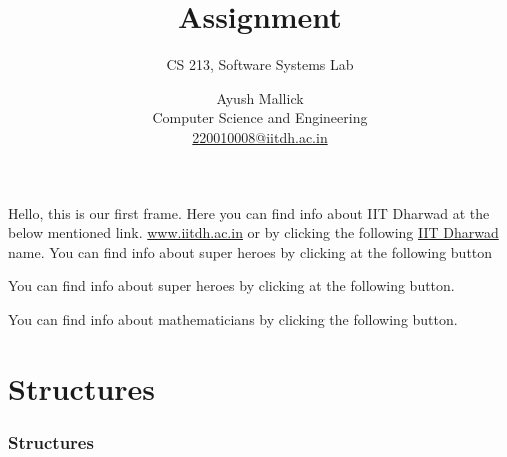 \documentclass{beamer}
\title{Assignment}
\subtitle{CS 213, Software Systems Lab}
\author[]{Ayush Mallick\\Computer Science and Engineering\\\href{mailto:220010008@iitdh.ac.in}{220010008@iitdh.ac.in}}
\institute[CSE, IIT Dharwad]{Indian Institute of Technology, Dharwad}
\begin{document}
\begin{frame}[plain]
\titlepage
\end{frame}
\begin{frame}[label=first]
Hello, this is our first frame. Here you can find info about IIT
Dharwad at the below mentioned link. \url{www.iitdh.ac.in} or by
clicking the following \href{www.iitdh.ac.in}{IIT Dharwad} name.
You can find info about super heroes by clicking at the following
button

You can find info about super heroes by clicking at the following
button. \hyperlink{superhero}{}

You can find info about mathematicians by clicking the following
button. \hyperlink{mathematicians}{}
\end{frame}

\section{Structures}

\begin{frame}
\frametitle{Structures}
\end{frame}
\end{document}
